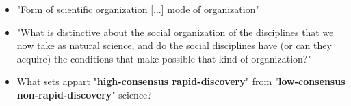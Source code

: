 
\begin{itemize}




\item "Form of scientific organization [...] mode of organization" \citep[158-160]{collins1994}

\item "What is distinctive about the social organization of the disciplines that we now take as natural science, and do the social disciplines have (or can they acquire) the conditions that make possible that kind of organization?" \citep[156]{collins1994}

\item What sets appart "\textbf{high-consensus rapid-discovery}" from "\textbf{low-consensus non-rapid-discovery}" science? \citep[158]{collins1994}

\end{itemize}



















	

	
		
		
		

